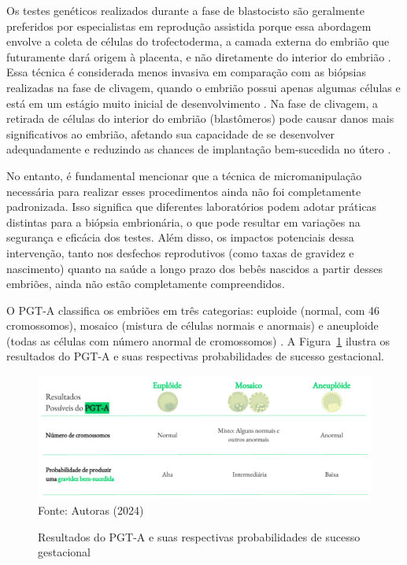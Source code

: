 Os testes genéticos realizados durante a fase de blastocisto são geralmente preferidos por especialistas em reprodução assistida porque essa abordagem envolve a coleta de células do trofectoderma, a camada externa do embrião que futuramente dará origem à placenta, e não diretamente do interior do embrião \cite{leaver2019}. Essa técnica é considerada menos invasiva em comparação com as biópsias realizadas na fase de clivagem, quando o embrião possui apenas algumas células e está em um estágio muito inicial de desenvolvimento \cite{leaver2019}. Na fase de clivagem, a retirada de células do interior do embrião (blastômeros) pode causar danos mais significativos ao embrião, afetando sua capacidade de se desenvolver adequadamente e reduzindo as chances de implantação bem-sucedida no útero \cite{leaver2019}. 

No entanto, é fundamental mencionar que a técnica de micromanipulação necessária para realizar esses procedimentos ainda não foi completamente padronizada. Isso significa que diferentes laboratórios podem adotar práticas distintas para a biópsia embrionária, o que pode resultar em variações na segurança e eficácia dos testes. Além disso, os impactos potenciais dessa intervenção, tanto nos desfechos reprodutivos (como taxas de gravidez e nascimento) quanto na saúde a longo prazo dos bebês nascidos a partir desses embriões, ainda não estão completamente compreendidos.

O PGT-A classifica os embriões em três categorias: euploide (normal, com 46 cromossomos), mosaico (mistura de células normais e anormais) e aneuploide (todas as células com número anormal de cromossomos) \cite{cnyfertility2024}. A Figura~\ref{fig:ResultadosPGT} ilustra os resultados do PGT-A e suas respectivas probabilidades de sucesso gestacional.

\begin{center}
    \begin{figure}[h]
        \captionsetup{font=footnotesize, justification=centering, labelsep=period, position=above}
        \caption{Resultados do PGT-A e suas respectivas probabilidades de sucesso gestacional}
        \label{fig:ResultadosPGT}
        \centering
        \includegraphics[scale=0.5]{figuras/ResultadosPGT.pdf}
        \vspace{0.3cm} 
        \scriptsize{Fonte: Autoras (2024)}
    \end{figure}
\end{center}
\FloatBarrier

